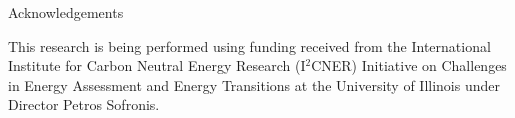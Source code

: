 \documentclass[final]{beamer}
\newlength{\onecolwid}
\newlength{\threecolwid}
\begin{document}
\begin{frame}[t]
\begin{columns}[t,totalwidth=\threecolwid]
\begin{column}{\onecolwid}


\begin{block}{Acknowledgements}

This research is being performed using funding received
from the International Institute for Carbon Neutral Energy Research (I$^2$CNER) 
Initiative on Challenges in Energy Assessment and Energy Transitions at  the  
University of Illinois under Director Petros Sofronis.

\vspace{10mm}
\begin{center}
\begin{tabular}{cccc}

\end{tabular}
\end{center}
\end{block}
\end{column}
\end{columns}
\end{frame}
\end{document}
